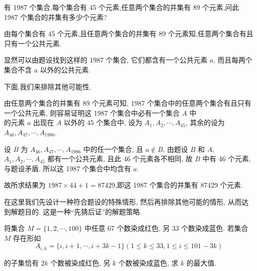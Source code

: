 \begin{example}
	有 1987 个集合,每个集合有 45 个元素,任意两个集合的并集有 89 个元素,问此 1987 个集合的并集有多少个元素?
\end{example}

\begin{analysis}
	由每个集合有 45 个元素,且任意两个集合的并集有 89 个元素知,任意两个集合有且只有一个公共元素.
\end{analysis}

\begin{solution}
	显然可以由题设找到这样的 1987 个集合, 它们都含有一个公共元素 $a$, 而且每两个集合不含 $a$ 以外的公共元素.

	下面,我们来排除其他可能性.

	由任意两个集合的并集有 89 个元素可知, 1987 个集合中的任意两个集合有且只有一个公共元素, 则容易证明这 1987 个集合中必有一个集合 $A$ 中\\
	的元素 $a$ 出现在 $A$ 以外的 45 个集合中, 设为 $A_{1}, A_{2}, \cdots, A_{45}$, 其余的设为 $A_{46}, A_{47}, \cdots, A_{1986}$.

	设 $B$ 为 $A_{46}, A_{47}, \cdots, A_{1986}$ 中的任一个集合, 且 $a \notin B$, 由题设 $B$ 和 $A$, $A_{1}, A_{2}, \cdots, A_{45}$ 都有一个公共元素, 且此 46 个元素各不相同, 故 $B$ 中有 46 个元素,与题设矛盾. 所以这 1987 个集合中均含有 $a$.

	故所求结果为 $1987 \times 44+1=87429$,即这 1987 个集合的并集有 87429 个元素.
\end{solution}

\begin{note}
	在这里我们先设计一种符合题设的特殊情形, 然后再排除其他可能的情形, 从而达到解题目的. 这是一种“先猜后证”的解题策略.
\end{note}

\begin{example}
	将集合 $M=\{1,2, \cdots, 100\}$ 中任意 67 个数染成红色, 另 33 个数染成蓝色. 若集合 $M$ 存在形如
	$$
		A_{i, k}=\{i, i+1, \cdots, i+3 k-1\}(1 \leqslant k \leqslant 33,1 \leqslant i \leqslant 101-3 k)
	$$

	的子集恰有 $2 k$ 个数被染成红色, 另 $k$ 个数被染成蓝色, 求 $k$ 的最大值.
\end{example}

